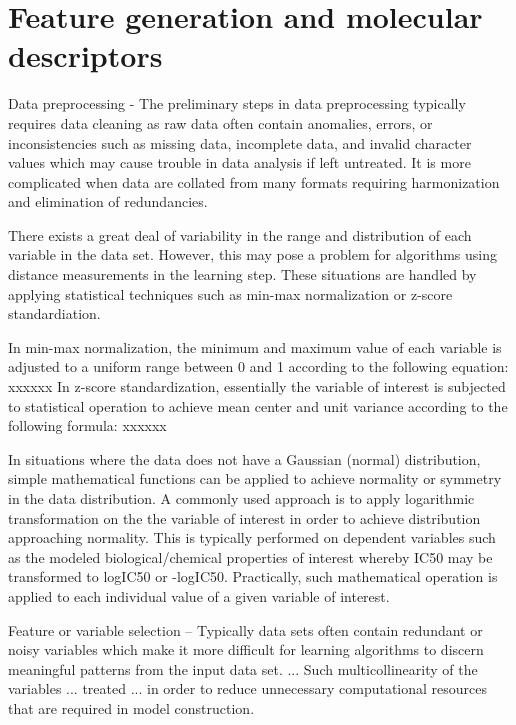 \section{Feature generation and molecular descriptors}

Data preprocessing - The preliminary steps in data preprocessing typically requires data cleaning as raw data often contain anomalies, errors, or inconsistencies such as missing data, incomplete data, and invalid character values which may cause trouble in data analysis if left untreated. It is more complicated when data are collated from many formats requiring harmonization and elimination of redundancies.\cite{Nantasenamat2009}

There exists a great deal of variability in the range and distribution of each variable in the data set. However, this may pose a problem for algorithms using distance measurements in the learning step. These situations are handled by applying statistical techniques such as min-max normalization or z-score standardiation. 

In min-max normalization, the minimum and maximum value of each variable is adjusted to a uniform range between 0 and 1 according to the following equation: xxxxxx In z-score standardization, essentially the variable of interest is subjected to statistical operation to achieve mean center and unit variance according to the following formula: xxxxxx \cite{Nantasenamat2009}

In situations where the data does not have a Gaussian (normal) distribution, simple mathematical functions can be applied to achieve normality or symmetry in the data distribution. A commonly used approach is to apply logarithmic transformation on the the variable of interest in order to achieve distribution approaching normality. This is typically performed on dependent variables such as the modeled biological/chemical properties of interest whereby IC50 may be transformed to logIC50 or -logIC50. Practically, such mathematical operation is applied to each individual value of a given variable of interest. \cite{Nantasenamat2009}

Feature or variable selection -- Typically data sets often contain redundant or noisy variables which make it more difficult for learning algorithms to discern meaningful patterns from the input data set. ... Such multicollinearity of the variables ... treated ... in order to reduce unnecessary computational resources that are required in model construction. \cite{Nantasenamat2009}


